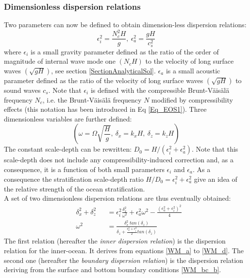 \documentclass[a4paper,11pt]{article}
\begin{document}
\subsubsection{Dimensionless dispersion relations}
Two parameters can now be defined to obtain dimension-less dispersion relations:
\begin{equation}
     \epsilon_i^2 =  \frac{N_c^2 H}{g} 
    ,\ \epsilon_a^2 = \frac{g H}{c_s^2} 
\end{equation}
where $\epsilon_i$ is a small gravity parameter defined as the ratio of the order of magnitude of internal wave mode one $(N_c H)$ to the velocity of long surface waves $(\sqrt{gH})$, see  section \ref{SectionAnalyticalSol}.
$\epsilon_a$ is a small acoustic parameter defined as the ratio of the velocity of long surface waves $(\sqrt{gH})$ to sound waves $c_s$. Note that $\epsilon_i$ is defined with the compressible Brunt-Väisälä frequency $N_c$, i.e. the Brunt-Väisälä frequency $N$ modified by compressibility effects (this notation has been introduced in Eq \ref{Eq_EOS1}). Three dimensionless variables are further defined:
\begin{equation}
    \left( \omega = \Omega \sqrt{\frac{H}{g}}
    ,\ \delta_x = k_x H
    ,\ \delta_z = k_z H \right)
\end{equation}
The constant scale-depth can be rewritten: $D_0=H/(\epsilon_i^2+\epsilon_a^2)$.  Note that this scale-depth does not include any compressibility-induced correction and, as a consequence, it is a function of both small parameters $\epsilon_i$ and $\epsilon_a$. As a consequence the stratification scale-depth ratio $H/D_0=\epsilon_i^2+\epsilon_a^2$ give an idea of the relative strength of the ocean stratification.\\
A set of two dimensionless dispersion relations are thus eventually obtained:
\begin{subequations}
	\label{EqFullDisper}
	\begin{alignat}{2}	
		\label{EqFullDispera}
 		& \delta_x^2+\delta_z^2 &&=\epsilon_i^2\frac{\delta_x^2}
 			{\omega^2}+\epsilon_a^2\omega^2-\frac{(\epsilon_a^2+\epsilon_i^2)^2}{4}\\[3mm]
		\label{EqFullDisperb}
		& \omega^2 &&=\frac{\delta_x^2\ tan(\delta_z)}
		{\delta_z+\frac{\epsilon_a^2+\epsilon_i^2}			{2}tan(\delta_z)}
	\end{alignat}
\end{subequations}
The first relation (hereafter the \textit{inner dispersion relation}) is the dispersion relation for the inner-ocean. It derives from equations \ref{WM_a} to \ref{WM_d}. The second one (hereafter the \textit{boundary dispersion relation}) is the dispersion relation deriving from the surface and bottom boundary conditions \ref{WM_bc_b}.
\end{document}
